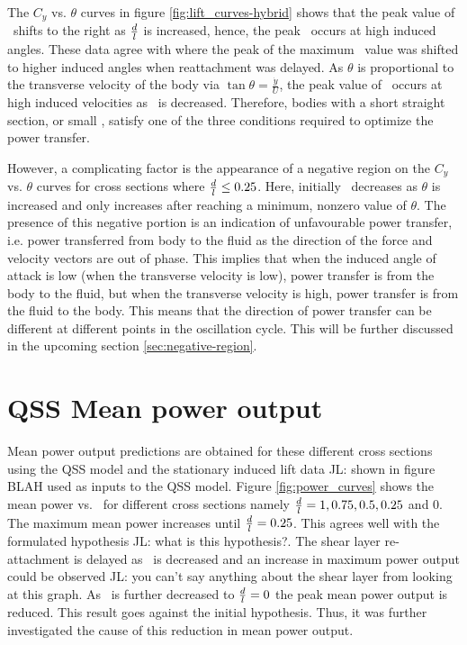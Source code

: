  

The $C_y$ vs. $\theta$ curves in figure \ref{fig:lift_curves-hybrid} shows that the peak value of \cy\ shifts to the right as $\frac{d}{l}$ is increased, hence, the peak \cy\ occurs at high induced angles.  These data agree with \citet{Luo1994} where the peak of the maximum \cy\ value was shifted to higher induced angles when reattachment was delayed. As $\theta$ is proportional to the transverse velocity of the body via $\tan{\theta}=\frac{\dot{y}}{U}$, the peak value of \cy\ occurs at high induced velocities as \ratio\ is decreased. Therefore, bodies with a short straight section, or small \ratio, satisfy one of the three conditions required to optimize the power transfer.

However, a complicating factor is the appearance of a negative region on the $C_y$ vs. $\theta$ curves for cross sections where $\frac{d}{l}\leq0.25$. Here, initially \cy\ decreases as $\theta$ is increased and only increases after reaching a minimum, nonzero value of $\theta$. The presence of this negative portion is an indication of unfavourable power transfer, i.e. power transferred from body to the fluid as the direction of the force and velocity vectors are out of phase. This implies that when the induced angle of attack is low (when the transverse velocity is low), power transfer is from the body to the fluid, but when the transverse velocity is high, power transfer is from the fluid to the body. This means that the direction of power transfer can be different at different points in the oscillation cycle. This will be further discussed in the upcoming section \ref{sec:negative-region}.

 
 
 \section{QSS Mean power output}
 \label{sec:cross-sec-qss-mean power}
 
 
 
 Mean power output predictions are obtained for these different cross sections using the QSS model and the stationary induced lift data JL: shown in figure BLAH used as inputs to the QSS model. Figure \ref{fig:power_curves} shows the mean power vs. \massdamp\ for different cross sections namely $\frac{d}{l}=1,0.75,0.5,0.25$ and $0$. The maximum mean power increases until $\frac{d}{l}=0.25$. This agrees well with the formulated hypothesis JL: what is this hypothesis?. The shear layer re-attachment is delayed as \ratio\ is decreased and an increase in maximum power output could be observed JL: you can't say anything about the shear layer from looking at this graph. As \ratio\ is further decreased to $\frac{d}{l}=0$ the peak mean power output is reduced. This result goes against the initial hypothesis. Thus, it was further investigated the cause of this reduction in mean power output. 

